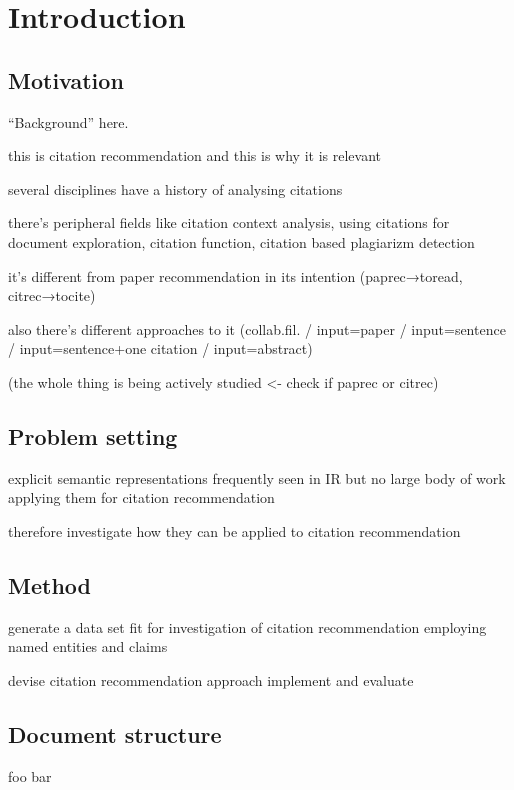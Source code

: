 \chapter{Introduction}\label{chap:introduction}
\section{Motivation}
``Background'' here.

this is citation recommendation and this is why it is relevant

several disciplines have a history of analysing citations\cite{White2004}

there's peripheral fields like citation context analysis\cite{HERNANDEZ-ALVAREZ2016}, using citations for document exploration\cite{Berger2016}, citation function\cite{Moravcsik1975,Abujbara2013,Teufel2006a,Teufel2006b}, citation based plagiarizm detection\cite{Gipp2010}

it’s different from paper recommendation in its intention (paprec→toread, citrec→tocite)

also there’s different approaches to it (collab.fil. / input=paper / input=sentence / input=sentence+one citation\cite{Kobayashi2018} / input=abstract\cite{Ayala-Gomez2018})

(the whole thing is being actively studied\cite{Beel2016} <- check if paprec or citrec)

\section{Problem setting}\label{sec:problemsetting}
explicit semantic representations frequently seen in IR but no large body of work applying them for citation recommendation

therefore investigate how they can be applied to citation recommendation

\section{Method}\label{sec:method}
generate a data set fit for investigation of citation recommendation employing named entities and claims

devise citation recommendation approach implement and evaluate

\section{Document structure}\label{sec:documentstructure}
foo bar

